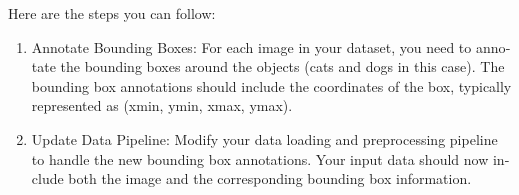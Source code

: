 \documentclass{article}
\begin{document}
\begin{latin}

Here are the steps you can follow:

\begin{enumerate}

    \item Annotate Bounding Boxes: For each image in your dataset, you need to annotate the bounding boxes around the objects (cats and dogs in this case). The bounding box annotations should include the coordinates of the box, typically represented as (xmin, ymin, xmax, ymax).

\item Update Data Pipeline: Modify your data loading and preprocessing pipeline to handle the new bounding box annotations. Your input data should now include both the image and the corresponding bounding box information.

\end{enumerate}

\end{latin}


\section{}
\end{document}
